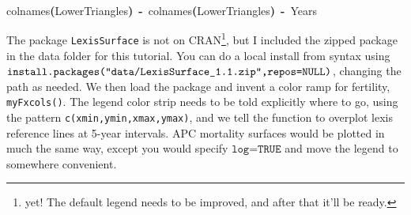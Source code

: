 \documentclass[a4paper]{article}
\newcommand{\hlfunctioncall}[1]{\textcolor[rgb]{1,0,0}{#1}}%
\newcommand{\hlkeyword}[1]{\textcolor[rgb]{0,0,0}{\textbf{#1}}}%
\newcommand{\hlassignement}[1]{\textcolor[rgb]{0.215686274509804,0.215686274509804,0.384313725490196}{\textbf{#1}}}%
\newcommand{\hlsymbol}[1]{\textcolor[rgb]{0,0,0}{#1}}%
\newcommand{\hlprompt}[1]{\textcolor[rgb]{0,0,0}{#1}}%
\newcommand{\hlstd}[1]{\textcolor[rgb]{0,0,0}{#1}}%
\newenvironment{Houtput}{\raggedright}{%
%
}
\begin{document}
\begin{Houtput}
\normalfont
\hspace*{\fill}\\
\hlstd{}\ttfamily\noindent
\hlprompt{\usebox{\hlnormalsizeboxgreaterthan}{\ }}\hlfunctioncall{colnames}\hlkeyword{(}\hlsymbol{LowerTriangles}\hlkeyword{)}{\ }\hlassignement{\usebox{\hlnormalsizeboxlessthan}-}{\ }\hlfunctioncall{colnames}\hlkeyword{(}\hlsymbol{LowerTriangles}\hlkeyword{)}{\ }\hlassignement{\usebox{\hlnormalsizeboxlessthan}-}{\ }\hlsymbol{Years}\mbox{}
\normalfont
\hspace*{\fill}\\
\hlstd{}
\end{Houtput}

The package \texttt{LexisSurface} is not on CRAN\footnote{yet! The default legend needs to be improved, and after that it'll be ready.}, but I included the zipped package in the data folder for this tutorial. You can do a local install from syntax using $\texttt{install.packages("data/LexisSurface\textunderscore 1.1.zip",repos=NULL)}$, changing the path as needed. We then load the package and invent a color ramp for fertility, \texttt{myFxcols()}. The legend color strip needs to be told explicitly where to go, using the pattern \texttt{c(xmin,ymin,xmax,ymax)}, and we tell the function to overplot lexis reference lines at 5-year intervals. APC mortality surfaces would be plotted in much the same way, except you would specify $\texttt{log=TRUE}$ and move the legend to somewhere convenient.
\end{document}
